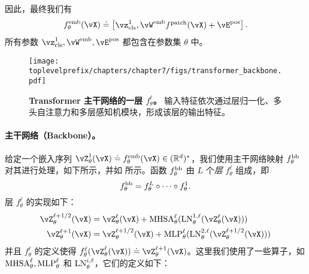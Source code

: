 \documentclass[../../book-main_zh.tex]{subfiles}
\begin{document}
因此，最终我们有
\begin{equation}\label{eq:definition_of_embedding_module}
    f_{\theta}^{\emb}(\vX) \doteq \mat{\vz_{\cls}^{1}, \vW^{\emb}f^{\patch}(\vX) + \vE^{\pos}}.
\end{equation}
所有参数 \(\vz_{\cls}^{1}, \vW^{\emb}, \vE^{\pos}\) 都包含在参数集 \(\theta\) 中。

\begin{figure}
    \centering 
    \texttt{[image: \\toplevelprefix/chapters/chapter7/figs/transformer\_backbone.pdf]}
    \caption{\small\textbf{Transformer 主干网络的一层 \(f_{\theta}^{\ell}\)。} 输入特征依次通过层归一化、多头自注意力和多层感知机模块，形成该层的输出特征。}
    \label{fig:transformer_backbone}
\end{figure}

\paragraph{主干网络（Backbone）。} 给定一个嵌入序列 \(\vZ_{\theta}^{1}(\vX) \doteq f_{\theta}^{\emb}(\vX) \in (\R^{d})^{*}\)，我们使用主干网络映射 \(f_{\theta}^{\mathrm{bb}}\) 对其进行处理，如下所示，并如  所示。函数 \(f_{\theta}^{\mathrm{bb}}\) 由 \(L\) 个\textit{层} \(f_{\theta}^{\ell}\) 组成，即
\begin{equation}
    f_{\theta}^{\mathrm{bb}} = f_{\theta}^{L} \circ \cdots \circ f_{\theta}^{1}.
\end{equation}
 层 \(f_{\theta}^{\ell}\) 的实现如下：
\begin{align}\label{eq:vit-res-block}
    \vZ_{\theta}^{\ell + 1/2}(\vX)
    &= \vZ_{\theta}^{\ell}(\vX) + \MHSA_{\theta}^{\ell}(\LN_{\theta}^{1, \ell}(\vZ_{\theta}^{\ell}(\vX))) \\ 
    \vZ_{\theta}^{\ell + 1}(\vX)
    &= \vZ_{\theta}^{\ell + 1/2}(\vX) + \MLP_{\theta}^{\ell}(\LN_{\theta}^{2, \ell}(\vZ_{\theta}^{\ell + 1/2}(\vX)))
\end{align}
并且 \(f_{\theta}^{\ell}\) 的定义使得 \(f_{\theta}^{\ell}(\vZ_{\theta}^{\ell}(\vX)) \doteq \vZ_{\theta}^{\ell + 1}(\vX)\)。这里我们使用了一些算子，如 \(\operatorname{MHSA}_{\theta}^{\ell}, \operatorname{MLP}_{\theta}^{\ell}\) 和 \(\operatorname{LN}_{\theta}^{i, \ell}\)，它们的定义如下：
\end{document}
